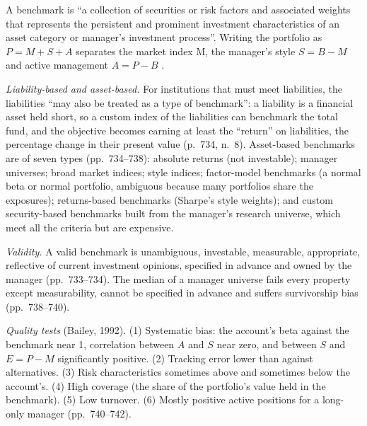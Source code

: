 \begin{qfmethod}\label{meth:benchmark-selection-quality}
 A benchmark is ``a collection of securities or risk factors and associated weights that represents the persistent and prominent investment characteristics of an asset category or manager's investment process''. Writing the portfolio as $P=M+S+A$ separates the market index M, the manager's style $S=B-M$ and active management $A=P-B$ \citep[chap.~12, pp.~731--733, eqs.~(12-6)--(12-7)]{managing-investment-portfolios-2007}.

\emph{Liability-based and asset-based.} For institutions that must meet liabilities, the liabilities ``may also be treated as a type of benchmark'': a liability is a financial asset held short, so a custom index of the liabilities can benchmark the total fund, and the objective becomes earning at least the ``return'' on liabilities, the percentage change in their present value (p.~734, n.~8). Asset-based benchmarks are of seven types (pp.~734--738): absolute returns (not investable); manager universes; broad market indices; style indices; factor-model benchmarks (a normal beta or normal portfolio, ambiguous because many portfolios share the exposures); returns-based benchmarks (Sharpe's style weights); and custom security-based benchmarks built from the manager's research universe, which meet all the criteria but are expensive.

\emph{Validity.} A valid benchmark is unambiguous, investable, measurable, appropriate, reflective of current investment opinions, specified in advance and owned by the manager (pp.~733--734). The median of a manager universe fails every property except measurability, cannot be specified in advance and suffers survivorship bias (pp.~738--740).

\emph{Quality tests} (Bailey, 1992). (1) Systematic bias: the account's beta against the benchmark near 1, correlation between $A$ and $S$ near zero, and between $S$ and $E=P-M$ significantly positive. (2) Tracking error lower than against alternatives. (3) Risk characteristics sometimes above and sometimes below the account's. (4) High coverage (the share of the portfolio's value held in the benchmark). (5) Low turnover. (6) Mostly positive active positions for a long-only manager (pp.~740--742).


\end{qfmethod}
